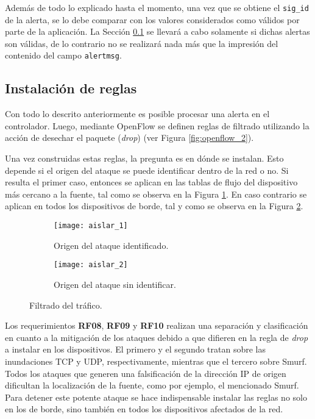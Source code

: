 Además de todo lo explicado hasta el momento, una vez que se obtiene el
\verb|sig_id| de la alerta, se lo debe comparar con los valores considerados
como válidos por parte de la aplicación. La Sección \ref{sec:install_rules} se
llevará a cabo solamente si dichas alertas son válidas, de lo contrario no se
realizará nada más que la impresión del contenido del campo \verb|alertmsg|.

\subsection{Instalación de reglas} \label {sec:install_rules}

Con todo lo descrito anteriormente es posible procesar una alerta en el
controlador. Luego, mediante OpenFlow se definen reglas de filtrado utilizando
la acción de desechar el paquete (\textit{drop}) (ver Figura
\ref{fig:openflow_2}).

Una vez construidas estas reglas, la pregunta es en dónde se instalan. Esto
depende si el origen del ataque se puede identificar dentro de la red o no. Si
resulta el primer caso, entonces se aplican en las tablas de flujo del
dispositivo más cercano a la fuente, tal como se observa en la Figura
\ref{fig:filtrado_trafico_1}. En caso contrario se aplican en todos los
dispositivos de borde, tal y como se observa en la Figura
\ref{fig:filtrado_trafico_2}.

\begin{figure}[H]
	\centering 
	\begin{subfigure}[b]{0.49\textwidth}
		\centering
		\texttt{[image: aislar\_1]}
		\caption{Origen del ataque identificado.}
		\label{fig:filtrado_trafico_1}
	\end{subfigure}
	\begin{subfigure}[b]{0.49\textwidth}
		\centering
		\texttt{[image: aislar\_2]}
		\caption{Origen del ataque sin identificar.}
		\label{fig:filtrado_trafico_2}
	\end{subfigure}
	\caption{Filtrado del tráfico.}
	\label{fig:filtrado_trafico_1_2}
\end{figure}

Los requerimientos \textbf{RF08}, \textbf{RF09} y \textbf{RF10} realizan una
separación y clasificación en cuanto a la mitigación de los ataques debido a que
difieren en la regla de \textit{drop} a instalar en los dispositivos. El primero
y el segundo tratan sobre las inundaciones TCP y UDP, respectivamente, mientras
que el tercero sobre Smurf. Todos los ataques que generen una falsificación de
la dirección IP de origen dificultan la localización de la fuente, como por
ejemplo, el mencionado Smurf. Para detener este potente ataque se hace
indispensable instalar las reglas no solo en los de borde, sino también en todos
los dispositivos afectados de la red.

